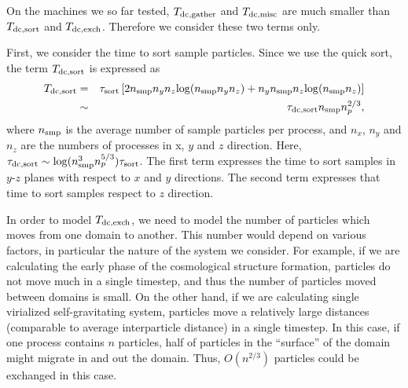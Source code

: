 On the machines we so far tested, $T_{\rm dc,gather}$ and $T_{\rm
  dc,misc}$ are much smaller than $T_{\rm dc,sort}$ and $T_{\rm
  dc,exch}$. Therefore we consider these two terms only.

First, we consider the time to sort sample particles. Since we use the
quick sort, the term $T_{\rm dc,sort}$ is expressed as
\begin{eqnarray}
T_{\rm dc,sort} &=& \tau_{\rm sort} \left[ 2n_{\rm smp} n_y n_z {\rm log} (n_{\rm smp} n_y n_z) + n_y n_{\rm smp} n_z {\rm log} (n_{\rm smp} n_z) \right] \\ 
             &\sim& \tau_{\rm dc,sort} n_{\rm smp}n_p^{2/3},
\end{eqnarray}
where $n_{\rm smp}$ is the average number of sample particles per
process, and $n_x$, $n_y$ and $n_z$ are the numbers of processes in x,
$y$ and $z$ direction. Here, $\tau_{\rm dc,sort} \sim {\rm log}(n_{\rm
smp}^3n_p^{5/3})\tau_{\rm sort}$. The first term expresses the time to
sort samples in $y$-$z$ planes with respect to $x$ and $y$
directions. The second term expresses that time to sort samples
respect to $z$ direction.

In order to model $T_{\rm dc,exch}$, we need to model the number of
particles which moves from one domain to another. This number would
depend on various factors, in particular the nature of the system we
consider. For example, if we are calculating the early phase of the
cosmological structure formation, particles do not move much in a
single timestep, and thus the number of particles moved between
domains is small. On the other hand, if we are calculating single
virialized self-gravitating system, particles move a relatively large
distances (comparable to average interparticle distance) in a single
timestep. In this case, if one process contains $n$ particles, half of
particles in the ``surface'' of the domain might migrate in and out
the domain. Thus, $O(n^{2/3})$ particles could be exchanged in this
case.

